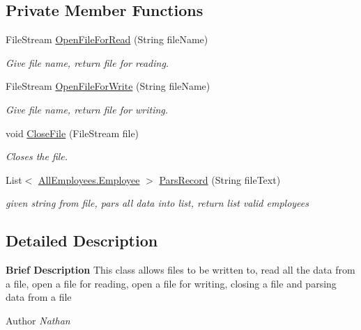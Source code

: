 \subsection*{Private Member Functions}
\begin{DoxyCompactItemize}
\item 
File\+Stream \hyperlink{class_supporting_1_1_file_i_o_ac9cebd77d6aca1292566d7e6eb4f8123}{Open\+File\+For\+Read} (String file\+Name)
\begin{DoxyCompactList}\small\item\em Give file name, return file for reading. \end{DoxyCompactList}\item 
File\+Stream \hyperlink{class_supporting_1_1_file_i_o_ab3be0f867327310b9d940d79e1147b69}{Open\+File\+For\+Write} (String file\+Name)
\begin{DoxyCompactList}\small\item\em Give file name, return file for writing. \end{DoxyCompactList}\item 
void \hyperlink{class_supporting_1_1_file_i_o_a689379fbd7441f18477d01dfde06444c}{Close\+File} (File\+Stream file)
\begin{DoxyCompactList}\small\item\em Closes the file. \end{DoxyCompactList}\item 
List$<$ \hyperlink{class_all_employees_1_1_employee}{All\+Employees.\+Employee} $>$ \hyperlink{class_supporting_1_1_file_i_o_ab4433298adf44f58cbd355eb5db0bf7f}{Pars\+Record} (String file\+Text)
\begin{DoxyCompactList}\small\item\em given string from file, pars all data into list, return list valid employees \end{DoxyCompactList}\end{DoxyCompactItemize}


\subsection{Detailed Description}
{\bfseries Brief Description} This class allows files to be written to, read all the data from a file, open a file for reading, open a file for writing, closing a file and parsing data from a file 

\begin{DoxyAuthor}{Author}
{\itshape Nathan} 
\end{DoxyAuthor}


